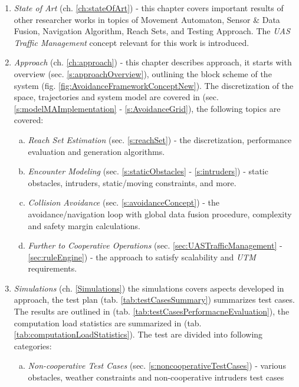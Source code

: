\begin{enumerate}
    \item \emph{State of Art} (ch. \ref{ch:stateOfArt}) - this chapter covers important results of other researcher works in topics of Movement Automaton, Sensor \& Data Fusion, Navigation Algorithm, Reach Sets, and Testing Approach. The \emph{UAS Traffic Management} concept relevant for this work is introduced.  
    
    \item \emph{Approach} (ch. \ref{ch:approach}) - this chapter describes approach, it starts with overview (sec. \ref{s:approachOverview}), outlining the block scheme of the system (fig. \ref{fig:AvoidanceFrameworkConceptNew}). The discretization of the space, trajectories and system model are covered in (sec. \ref{s:modelMAImplementation} - \ref{s:AvoidanceGrid}), the following topics are covered:
    \begin{enumerate}[a.]
        \item \emph{Reach Set Estimation} (sec. \ref{s:reachSet}) - the discretization, performance evaluation and generation algorithms.
        
        \item \emph{Encounter Modeling} (sec. \ref{s:staticObstacles} - \ref{s:intruders}) - static obstacles, intruders, static/moving constraints, and more.
        
        \item \emph{Collision Avoidance} (sec. \ref{s:avoidanceConcept}) - the avoidance/navigation loop with global data fusion procedure, complexity and safety margin calculations.
        
        \item \emph{Further to Cooperative Operations} (sec. \ref{sec:UASTrafficManagement} - \ref{sec:ruleEngine}) - the approach to satisfy scalability and \emph{UTM} requirements.
    \end{enumerate}
    
    \item \emph{Simulations} (ch. \ref{Simulations}) the simulations covers aspects developed in approach, the test plan (tab. \ref{tab:testCasesSummary}) summarizes test cases. The results are outlined in (tab. \ref{tab:testCasesPerformacneEvaluation}), the computation load statistics are summarized in (tab. \ref{tab:computationLoadStatistics}). The test are divided into following categories:
    
    \begin{enumerate}[a.]
        \item \emph{Non-cooperative Test Cases} (sec. \ref{s:noncooperativeTestCases}) - various obstacles, weather constraints and non-cooperative intruders test cases
    

\end{enumerate}
\end{enumerate}
